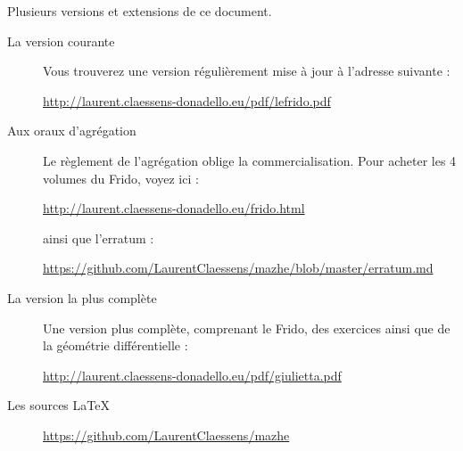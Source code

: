 

\thispagestyle{empty}

Plusieurs versions et extensions de ce document.
\begin{description}

	\item[La version courante]

	      Vous trouverez une version régulièrement mise à jour à l'adresse suivante :
	      \begin{center}
		      \url{http://laurent.claessens-donadello.eu/pdf/lefrido.pdf}
	      \end{center}

	\item[Aux oraux d'agrégation]

	      Le règlement de l'agrégation oblige la commercialisation. Pour acheter les 4 volumes du Frido, voyez ici :
	      \begin{center}
		      \url{http://laurent.claessens-donadello.eu/frido.html}
	      \end{center}
	      ainsi que l'erratum :
	      \begin{center}
		      \url{https://github.com/LaurentClaessens/mazhe/blob/master/erratum.md}
	      \end{center}

	\item[La version la plus complète]

	      Une version plus complète, comprenant le Frido, des exercices ainsi que de la géométrie différentielle :
	      \begin{center}
		      \url{http://laurent.claessens-donadello.eu/pdf/giulietta.pdf}
	      \end{center}

	\item[Les sources \LaTeX]
	      \begin{center}
		      \url{https://github.com/LaurentClaessens/mazhe}
	      \end{center}
\end{description}
